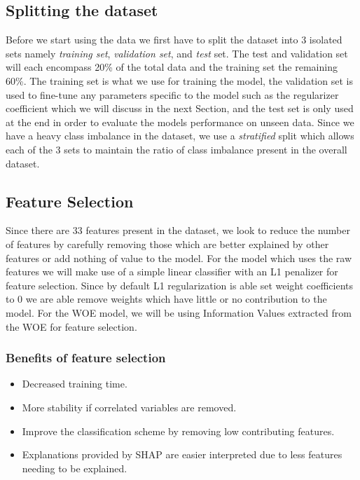 \subsection{Splitting the dataset}
Before we start using the data we first have to split the dataset into 3 isolated sets namely \emph{training set}, \emph{validation set}, and \emph{test} set. The test and validation set will each encompass 20\% of the total data and the training set the remaining 60\%. The training set is what we use for training the model, the validation set is used to fine-tune any parameters specific to the model such as the regularizer coefficient which we will discuss in the  next Section, and the test set is only used at the end in order to evaluate the models performance on unseen data. Since we have a heavy class imbalance in the dataset, we use a \emph{stratified} split which allows each of the 3 sets to maintain the ratio of class imbalance present in the overall dataset.
\subsection{Feature Selection}
Since there are 33 features present in the dataset, we look to reduce the number of features by carefully removing those which are better explained by other features or add nothing of value to the model.  For the model which uses the raw features we will make use of a simple linear classifier with an L1 penalizer for feature selection. Since by default L1 regularization is able set weight coefficients to 0 we are able remove weights which have little or no contribution to the model. For the WOE model, we will be using Information Values extracted from the WOE for feature selection.

\subsubsection{Benefits of feature selection}
\begin{itemize}
    \item Decreased training time.
    \item More stability if correlated variables are removed.
    \item Improve the classification scheme by removing low contributing features.
    \item Explanations provided by SHAP are easier interpreted due to less features needing to be explained.
\end{itemize}


